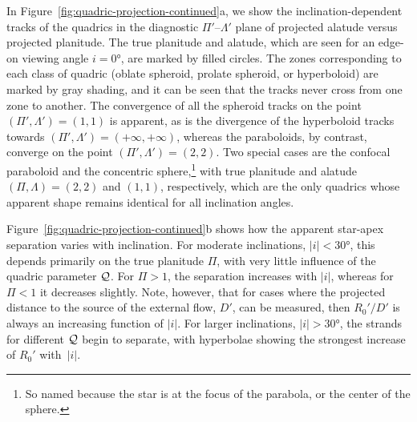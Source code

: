 \documentclass[useAMS, usenatbib, a4paper]{mnras}
\providecommand{\abs}[1]{\lvert#1\rvert}
\begin{document}
In Figure~\ref{fig:quadric-projection-continued}a, we show the
inclination-dependent tracks of the quadrics in the diagnostic
\(\Pi'\)--\(\Lambda'\) plane of projected alatude versus projected planitude.
The true planitude and alatude, which are seen for an edge-on viewing
angle \(i = \ang{0}\), are marked by filled circles.  The zones
corresponding to each class of quadric (oblate spheroid, prolate
spheroid, or hyperboloid) are marked by gray shading, and it can be
seen that the tracks never cross from one zone to another. The
convergence of all the spheroid tracks on the point
\((\Pi', \Lambda') = (1, 1)\) is apparent, as is the divergence of the
hyperboloid tracks towards \((\Pi', \Lambda') = (+\infty, +\infty)\), whereas the
paraboloids, by contrast, converge on the point
\((\Pi', \Lambda') = (2, 2)\).  Two special cases are the confocal paraboloid
and the concentric sphere,\footnote{So named because the star is at
  the focus of the parabola, or the center of the sphere.} with true
planitude and alatude \((\Pi, \Lambda) = (2, 2)\) and \((1, 1)\),
respectively, which are the only quadrics whose apparent shape remains
identical for all inclination angles.

Figure~\ref{fig:quadric-projection-continued}b shows how the apparent
star-apex separation varies with inclination.  For moderate
inclinations, \(\abs{i} < \ang{30}\), this depends primarily on the true
planitude \(\Pi\), with very little influence of the quadric parameter
\(\mathcal{Q}\).  For \(\Pi > 1\), the separation increases with \(\abs{i}\), whereas
for \(\Pi < 1\) it decreases slightly.  Note, however, that for cases
where the projected distance to the source of the external flow,
\(D'\), can be measured, then \(R_0'/D'\) is always an increasing
function of \(\abs{i}\).  For larger inclinations, \(\abs{i} > \ang{30}\), the
strands for different \(\mathcal{Q}\) begin to separate, with hyperbolae
showing the strongest increase of \(R_0'\) with~\(\abs{i}\).
\end{document}

